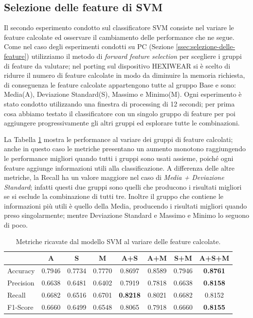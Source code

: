 \subsection{Selezione delle feature di SVM}
\label{ssec:selezione-delle-feature-di-svm-hexi}

Il secondo esperimento condotto sul classificatore SVM consiste nel variare le feature calcolate ed osservare il cambiamento delle performance che ne segue. 
Come nel caso degli esperimenti condotti su PC (Sezione \ref{ssec:selezione-delle-feature}) utilizziamo il metodo di \textit{forward feature selection} per scegliere i gruppi di feature da valutare; nel porting sul dispositivo HEXIWEAR si è scelto di ridurre il numero di feature calcolate in modo da diminuire la memoria richiesta, di conseguenza le feature calcolate appartengono tutte al gruppo Base e sono: Media(A), Deviazione Standard(S), Massimo e Minimo(M).
Ogni esperimento è stato condotto utilizzando una finestra di processing di 12 secondi; per prima cosa abbiamo testato il classificatore con un singolo gruppo di feature per poi aggiungere progressivamente gli altri gruppi ed esplorare tutte le combinazioni.

La Tabella \ref{tab:metrics-svm-feat-hexi} mostra le performance al variare dei gruppi di feature calcolati; anche in questo caso le metriche presentano un aumento monotono raggiungendo le performance migliori quando tutti i gruppi sono usati assieme, poiché ogni feature aggiunge informazioni utili alla classificazione. A differenza delle altre metriche, la Recall ha un valore maggiore nel caso di \textit{Media + Deviazione Standard}; infatti questi due gruppi sono quelli che producono i risultati migliori se si esclude la combinazione di tutti tre. Inoltre il gruppo che contiene le informazioni più utili è quello della Media, producendo i risultati migliori quando preso singolarmente; mentre Deviazione Standard e Massimo e Minimo lo seguono di poco.

\begin{table}
    \centering
    \begin{tabular}{l c c c c c c c}
        \hline
        & A & S & M & A+S & A+M & S+M & A+S+M \\
        \hline
        Accuracy & 0.7946 & 0.7734 & 0.7770 & 0.8697 & 0.8589 & 0.7946 & \textbf{0.8761} \\
        Precision & 0.6638 & 0.6481 & 0.6402 & 0.7919 & 0.7818 & 0.6638 & \textbf{0.8158} \\
        Recall & 0.6682 & 0.6516 & 0.6701 & \textbf{0.8218} & 0.8021 & 0.6682 & 0.8152 \\
        F1-Score & 0.6660 & 0.6499 & 0.6548 & 0.8065 & 0.7918 & 0.6660 & \textbf{0.8155} \\
        \hline
    \end{tabular}
    \caption{Metriche ricavate dal modello SVM al variare delle feature calcolate.}
    \label{tab:metrics-svm-feat-hexi}
\end{table}

